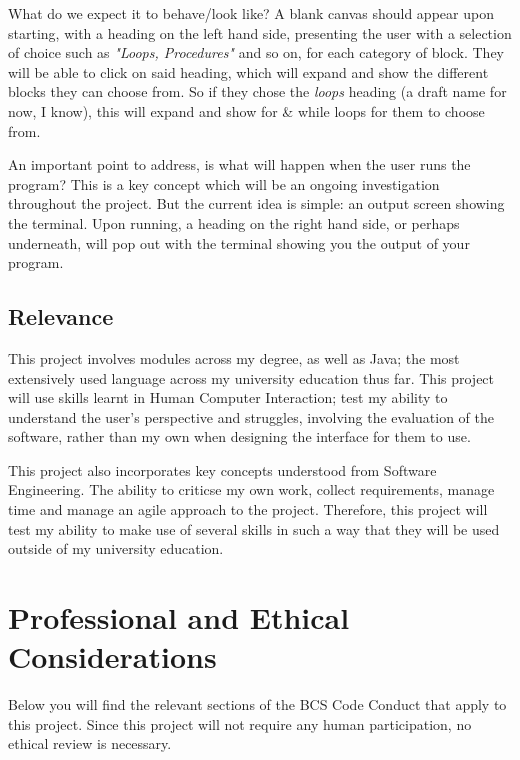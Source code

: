 \documentclass[a4paper, 12pt]{article}
\begin{document}
            What do we expect it to behave/look like? A blank canvas should appear upon starting, with
            a heading on the left hand side, presenting the user with a selection of choice such as
            \textit{"Loops, Procedures"} and so on, for each category of block. They will be able to click
            on said heading, which will expand and show the different blocks they can choose from. So if
            they chose the \textit{loops} heading (a draft name for now, I know), this will expand and show
            for \& while loops for them to choose from.

            An important point to address, is what will happen when the user runs the program? This is a key
            concept which will be an ongoing investigation throughout the project. But the current idea is
            simple: an output screen showing the terminal. Upon running, a heading on the right hand side,
            or perhaps underneath, will pop out with the terminal showing you the output of your program.


            \subsection{Relevance}
            This project involves modules across my degree, as well as Java; the most extensively
            used language across my university education thus far. This project will use skills learnt
            in Human Computer Interaction; test my ability to understand the user's perspective and
            struggles, involving the evaluation of the software, rather than my own when designing
            the interface for them to use.
        
            This project also incorporates key concepts understood from Software Engineering.
            The ability to criticse my own work, collect requirements, manage time and manage an
            agile approach to the project. Therefore, this project will test my ability to make use
            of several skills in such a way that they will be used outside of my university education.

    \clearpage
    \section{Professional and Ethical Considerations}
        Below you will find the relevant sections of the BCS Code Conduct that apply to this 
        project. Since this project will not require any human participation, no ethical review 
        is necessary.
\end{document}
